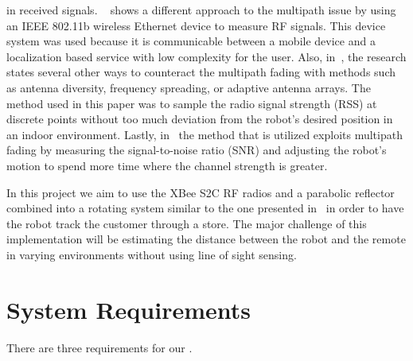 \documentclass[letterpaper,12pt]{article}   %
\begin{document}
in received signals. ~\cite{ladd_bekris_rudys_kavraki_wallach_2005} shows a
different approach to the multipath issue by using an IEEE 802.11b wireless
Ethernet device to measure RF signals. This device system was used because it is
communicable between a mobile device and a localization based service with low
complexity for the user. Also, in~\cite{lindhe_johansson_bicchi_2007}, the
research states several other ways to counteract the multipath fading with
methods such as antenna diversity, frequency spreading, or adaptive antenna
arrays. The method used in this paper was to sample the radio signal strength
(RSS) at discrete points without too much deviation from the robot's desired
position in an indoor environment. Lastly, in~\cite{Lindhe2009} the method that
is utilized exploits multipath fading by measuring the signal-to-noise ratio
(SNR) and adjusting the robot's motion to spend more time where the channel
strength is greater.

\vspace*{12pt}
\noindent
In this project we aim to use the XBee S2C RF radios and a parabolic reflector combined into a rotating system similar to the one presented in~\cite{Miah2018-Intelligent} in order to have the robot track the customer through a store. The major challenge of this implementation will be estimating the distance between the robot and the remote in varying environments without using line of sight sensing.

\section{System Requirements}
There are three  requirements for our . 
\end{document}
